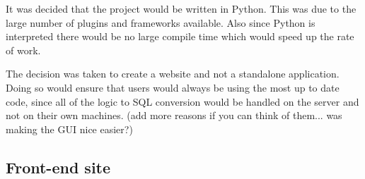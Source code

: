 \documentclass[a4paper, 11pt]{article}
\begin{document}
  It was decided that the project would be written in Python. This was due to
  the large number of plugins and frameworks available. Also since Python is
  interpreted there would be no large compile time which would speed up the rate
  of work.

  The decision was taken to create a website and not a standalone application.
  Doing so would ensure that users would always be using the most up to date
  code, since all of the logic to SQL conversion would be handled on the server
  and not on their own machines. (add more reasons if you can think of them...
  was making the GUI nice easier?)


                 

  \subsection{Front-end site}
\end{document}
